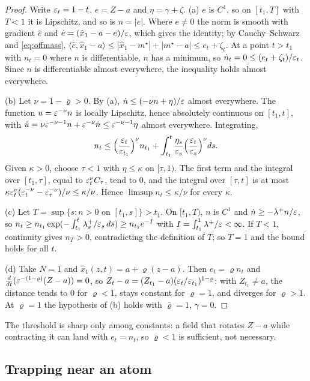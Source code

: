 \documentclass{article} %
\theoremstyle{plain}
\theoremstyle{definition}
\theoremstyle{remark}
\begin{document}
\begin{proof}
Write $\varepsilon_t=1-t$, $e=Z-a$ and $\eta=\gamma+\zeta$. (a) $e$ is $C^1$, so on $[t_1,T]$ with
$T<1$ it is Lipschitz, and so is $n=|e|$. Where $e\ne0$ the norm is smooth with gradient $\hat e$
and $\dot e=(\hat x_1-a-e)/\varepsilon$, which gives the identity; by Cauchy--Schwarz and
\eqref{eq:offmass}, $\langle\hat e,\hat x_1-a\rangle\le|\hat x_1-m^\star|+|m^\star-a|\le e_t+\zeta_t$.
At a point $t>t_1$ with $n_t=0$ where $n$ is differentiable, $n$ has a minimum, so
$\dot n_t=0\le(e_t+\zeta_t)/\varepsilon_t$. Since $n$ is differentiable almost everywhere, the inequality
holds almost everywhere.

(b) Let $\nu=1-\bar\varrho>0$. By (a), $\dot n\le(-\nu n+\eta)/\varepsilon$ almost everywhere. The function
$u=\varepsilon^{-\nu}n$ is locally Lipschitz, hence absolutely continuous on $[t_1,t]$, with
$\dot u=\nu\varepsilon^{-\nu-1}n+\varepsilon^{-\nu}\dot n\le\varepsilon^{-\nu-1}\eta$ almost everywhere. Integrating,
\[
n_t\le\Big(\frac{\varepsilon_t}{\varepsilon_{t_1}}\Big)^{\nu}n_{t_1}
+\int_{t_1}^t\frac{\eta_s}{\varepsilon_s}\Big(\frac{\varepsilon_t}{\varepsilon_s}\Big)^{\nu}ds .
\]
Given $\kappa>0$, choose $\tau<1$ with $\eta\le\kappa$ on $[\tau,1)$. The first term and the
integral over $[t_1,\tau]$, equal to $\varepsilon_t^\nu C_\tau$, tend to $0$, and the integral over
$[\tau,t]$ is at most $\kappa\varepsilon_t^\nu(\varepsilon_t^{-\nu}-\varepsilon_\tau^{-\nu})/\nu\le\kappa/\nu$. Hence
$\limsup n_t\le\kappa/\nu$ for every $\kappa$.

(c) Let $T=\sup\{s:n>0\text{ on }[t_1,s]\}>t_1$. On $[t_1,T)$, $n$ is $C^1$ and
$\dot n\ge-\lambda^+n/\varepsilon$, so $n_t\ge n_{t_1}\exp(-\int_{t_1}^t\lambda^+_s/\varepsilon_s\,ds)\ge n_{t_1}e^{-I}$
with $I=\int_{t_1}^1\lambda^+/\varepsilon<\infty$. If $T<1$, continuity gives $n_T>0$, contradicting the
definition of $T$; so $T=1$ and the bound holds for all $t$.

(d) Take $N=1$ and $\hat x_1(z,t)=a+\varrho(z-a)$. Then $e_t=\varrho n_t$ and
$\tfrac{d}{dt}(\varepsilon^{-(1-\varrho)}(Z-a))=0$, so $Z_t-a=(Z_{t_1}-a)(\varepsilon_t/\varepsilon_{t_1})^{1-\varrho}$: with
$Z_{t_1}\ne a$, the distance tends to $0$ for $\varrho<1$, stays constant for $\varrho=1$, and diverges
for $\varrho>1$. At $\varrho=1$ the hypothesis of (b) holds with $\bar\varrho=1$, $\gamma=0$.
\end{proof}

The threshold is sharp only among constants: a field that rotates $Z-a$ while contracting it can
land with $e_t=n_t$, so $\bar\varrho<1$ is sufficient, not necessary.

\subsection{Trapping near an atom}
\label{apx:pf-trap}
\end{document}
